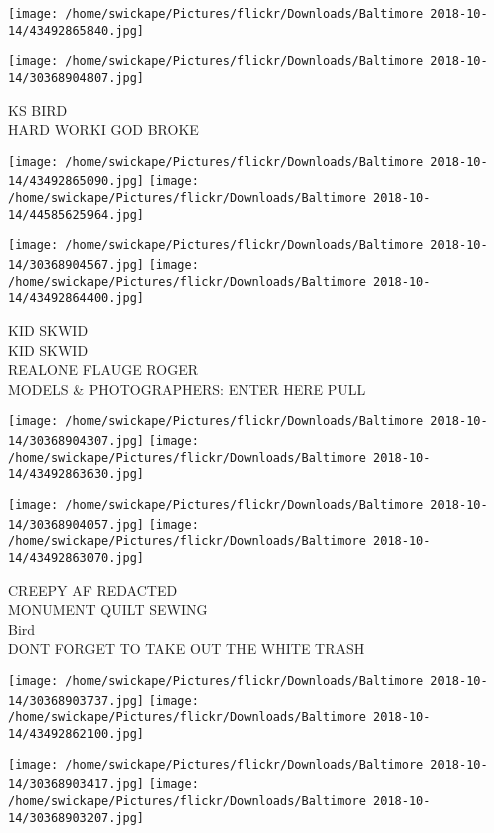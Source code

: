 \documentclass[10pt,letterpaper]{article}
\begin{document}
\texttt{[image: /home/swickape/Pictures/flickr/Downloads/Baltimore 2018-10-14/43492865840.jpg]}

\vspace{0.25in}
\texttt{[image: /home/swickape/Pictures/flickr/Downloads/Baltimore 2018-10-14/30368904807.jpg]}

KS BIRD\\
HARD WORKI GOD BROKE\\
\pagebreak

\texttt{[image: /home/swickape/Pictures/flickr/Downloads/Baltimore 2018-10-14/43492865090.jpg]}
\texttt{[image: /home/swickape/Pictures/flickr/Downloads/Baltimore 2018-10-14/44585625964.jpg]}

\texttt{[image: /home/swickape/Pictures/flickr/Downloads/Baltimore 2018-10-14/30368904567.jpg]}
\texttt{[image: /home/swickape/Pictures/flickr/Downloads/Baltimore 2018-10-14/43492864400.jpg]}

KID SKWID\\
KID SKWID\\
REALONE FLAUGE ROGER\\
MODELS \& PHOTOGRAPHERS: ENTER HERE PULL\\
\pagebreak

\texttt{[image: /home/swickape/Pictures/flickr/Downloads/Baltimore 2018-10-14/30368904307.jpg]}
\texttt{[image: /home/swickape/Pictures/flickr/Downloads/Baltimore 2018-10-14/43492863630.jpg]}

\texttt{[image: /home/swickape/Pictures/flickr/Downloads/Baltimore 2018-10-14/30368904057.jpg]}
\texttt{[image: /home/swickape/Pictures/flickr/Downloads/Baltimore 2018-10-14/43492863070.jpg]}

CREEPY AF REDACTED\\
MONUMENT QUILT SEWING\\
Bird\\
DONT FORGET TO TAKE OUT THE WHITE TRASH\\
\pagebreak

\texttt{[image: /home/swickape/Pictures/flickr/Downloads/Baltimore 2018-10-14/30368903737.jpg]}
\texttt{[image: /home/swickape/Pictures/flickr/Downloads/Baltimore 2018-10-14/43492862100.jpg]}

\texttt{[image: /home/swickape/Pictures/flickr/Downloads/Baltimore 2018-10-14/30368903417.jpg]}
\texttt{[image: /home/swickape/Pictures/flickr/Downloads/Baltimore 2018-10-14/30368903207.jpg]}
\end{document}
